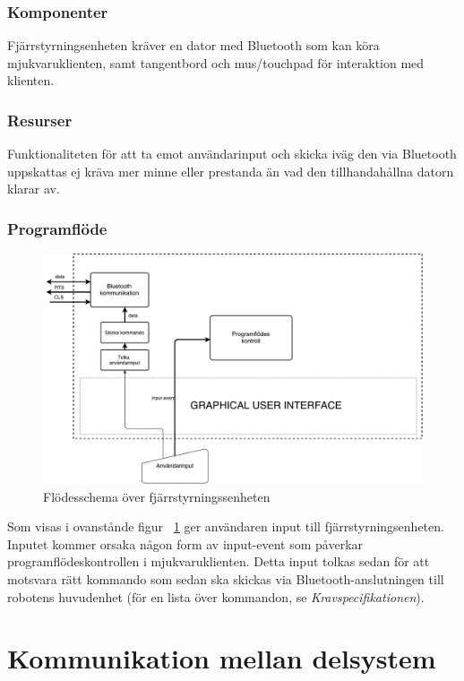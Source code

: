 \documentclass{article}
\begin{document}
\subsubsection{Komponenter}
Fjärrstyrningsenheten kräver en dator med Bluetooth som kan köra mjukvaruklienten, samt tangentbord och mus/touchpad för interaktion med klienten. 

\subsubsection{Resurser}
Funktionaliteten för att ta emot användarinput och skicka iväg den via Bluetooth uppskattas ej kräva mer minne eller prestanda än vad den tillhandahållna datorn klarar av.

\subsubsection{Programflöde}
\begin{figure}[H]
\centering 
\includegraphics[scale=0.4]{Fjarrstyrningsenhet_flowchart2}
\caption{Flödesschema över fjärrstyrningssenheten}
\label{fig:Fjarrstyrningsenhet_flowchart2}
\end{figure}
Som visas i ovanstånde figur ~\ref{fig:Fjarrstyrningsenhet_flowchart2} ger användaren input till fjärrstyrningsenheten. Inputet kommer orsaka någon form av input-event som påverkar programflödeskontrollen i mjukvaruklienten. Detta input tolkas sedan för att motsvara rätt kommando som sedan ska skickas via Bluetooth-anslutningen till robotens huvudenhet (för en lista över kommandon, se \textit{Kravspecifikationen}).

\clearpage

\section{Kommunikation mellan delsystem}
\end{document}
